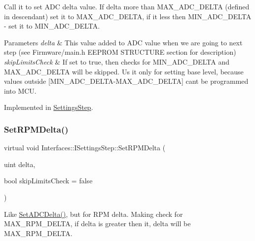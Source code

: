 Call it to set A\+DC delta value. If delta more than M\+A\+X\+\_\+\+A\+D\+C\+\_\+\+D\+E\+L\+TA (defined in descendant) set it to M\+A\+X\+\_\+\+A\+D\+C\+\_\+\+D\+E\+L\+TA, if it less then M\+I\+N\+\_\+\+A\+D\+C\+\_\+\+D\+E\+L\+TA -\/ set it to M\+I\+N\+\_\+\+A\+D\+C\+\_\+\+D\+E\+L\+TA. 


\begin{DoxyParams}{Parameters}
{\em delta} & This value added to A\+DC value when we are going to next step (see Firmware/main.\+h E\+E\+P\+R\+OM S\+T\+R\+U\+C\+T\+U\+RE section for description) \\
\hline
{\em skip\+Limits\+Check} & If set to true, then checks for M\+I\+N\+\_\+\+A\+D\+C\+\_\+\+D\+E\+L\+TA and M\+A\+X\+\_\+\+A\+D\+C\+\_\+\+D\+E\+L\+TA will be skipped. Us it only for setting base level, because values outside \mbox{[}M\+I\+N\+\_\+\+A\+D\+C\+\_\+\+D\+E\+L\+T\+A-\/\+M\+A\+X\+\_\+\+A\+D\+C\+\_\+\+D\+E\+L\+TA\mbox{]} can\textquotesingle{}t be programmed into M\+CU. \\
\hline
\end{DoxyParams}


Implemented in \hyperlink{class_settings_step_a8124c87ae0b1d9fb3b623144d0e492db}{Settings\+Step}.

\mbox{\label{class_interfaces_1_1_i_settings_step_a62997701dc6ad91ec0a9d699ef99463e}} 
\subsubsection{\texorpdfstring{Set\+R\+P\+M\+Delta()}{SetRPMDelta()}}
{\footnotesize\ttfamily virtual void Interfaces\+::\+I\+Settings\+Step\+::\+Set\+R\+P\+M\+Delta (\begin{DoxyParamCaption}\item[{uint}]{delta,  }\item[{bool}]{skip\+Limits\+Check = {\ttfamily false} }\end{DoxyParamCaption})\hspace{0.3cm}{\ttfamily [pure virtual]}}



Like \hyperlink{class_interfaces_1_1_i_settings_step_a83f00b8b66f6566721065e34e41508c6}{Set\+A\+D\+C\+Delta()}, but for R\+PM delta. Making check for M\+A\+X\+\_\+\+R\+P\+M\+\_\+\+D\+E\+L\+TA, if delta is greater then it, delta will be M\+A\+X\+\_\+\+R\+P\+M\+\_\+\+D\+E\+L\+TA. 


